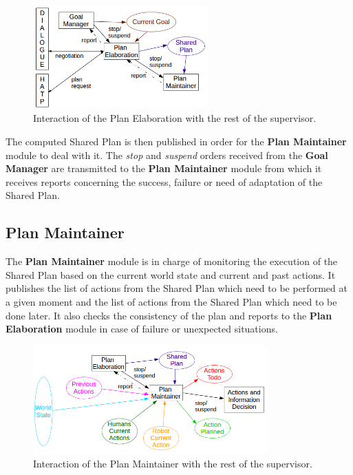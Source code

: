 \documentclass[english,a4paper,11pt,twoside]{StyleThese}
\begin{document}
\begin{figure}[!h]
	\centering
    \includegraphics[width=0.6\textwidth]{figs/Chapter2/PlanElaboration.png}
    \caption{Interaction of the Plan Elaboration with the rest of the supervisor.}
    \label{fig:planElaboration}
\end{figure}

The computed Shared Plan is then published in order for the \textbf{Plan Maintainer} module to deal with it. The \textit{stop} and \textit{suspend} orders received from the \textbf{Goal Manager} are transmitted to the \textbf{Plan Maintainer} module from which it receives reports concerning the success, failure or need of adaptation of the Shared Plan.

\newpage
\subsection{Plan Maintainer}

The \textbf{Plan Maintainer} module is in charge of monitoring the execution of the Shared Plan based on the current world state and current and past actions. It publishes the list of actions from the Shared Plan which need to be performed at a given moment and the list of actions from the Shared Plan which need to be done later. It also checks the consistency of the plan and reports to the \textbf{Plan Elaboration} module in case of failure or unexpected situations.

\begin{figure}[!h]
	\centering
    \includegraphics[width=0.8\textwidth]{figs/Chapter2/PlanMaintainer.png}
    \caption{Interaction of the Plan Maintainer with the rest of the supervisor.}
    \label{fig:planMaintainer}
\end{figure}
\end{document}
